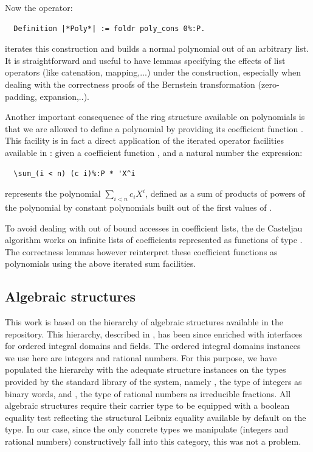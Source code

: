 \documentclass{mscs}
\begin{document}
Now the operator:
\begin{lstlisting}
  Definition |*Poly*| := foldr poly_cons 0%:P.
\end{lstlisting}
iterates this construction and builds a normal polynomial out of an
arbitrary list. It is straightforward and useful to have lemmas
specifying the effects of list operators (like catenation,
mapping,...) under the  construction, especially when dealing
with the correctness proofs of the Bernstein transformation
(zero-padding, expansion,..).

Another important consequence of the ring structure available on
polynomials is that we are allowed to
define a polynomial by providing its coefficient function
. This facility is
in fact a direct application of the iterated operator facilities
available in \ssr{} \cite{BGOBP:BIG08}: given a coefficient function
, and a natural number  the expression:
\begin{lstlisting}
  \sum_(i < n) (c i)%:P * 'X^i
\end{lstlisting}
represents the polynomial $\sum_{i < n}c_i X^i$, defined as a sum of
products of powers of the polynomial  by constant polynomials
built out of the first values of .

To avoid dealing with out of bound accesses in coefficient lists, the
de Casteljau algorithm works on infinite lists of coefficients
represented as functions of type . The correctness lemmas
however reinterpret these coefficient functions as polynomials using
the above iterated sum facilities.

\subsection{Algebraic structures}

This work is based on the hierarchy of algebraic structures available
in the \ssr{} repository. This hierarchy, described in \cite{hieralg},
has been since enriched with interfaces for ordered integral
domains and fields. The ordered integral domains instances we use here are
integers and rational numbers. For this purpose, we have populated the
hierarchy with the adequate structure instances on the types provided
by the standard library of the \Coq{} system, namely , the type
of integers as binary words, and , the type of rational numbers
as irreducible fractions. All \ssr{} algebraic
structures require their carrier type to be equipped with a boolean
equality test reflecting the structural Leibniz equality available by
default on the type. In our case, since the only concrete types
we manipulate (integers and rational numbers) constructively fall into
this category, this was not a problem.
\end{document}
